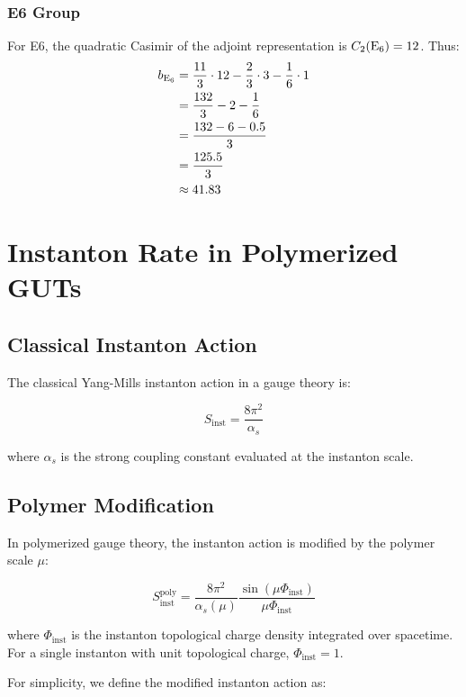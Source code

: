 \documentclass[11pt]{article}
\begin{document}
\subsubsection{E6 Group}
For E6, the quadratic Casimir of the adjoint representation is $C_2(\mathrm{E}_{6}) = 12$. Thus:
\begin{align}
b_{\mathrm{E}_{6}} &= \frac{11}{3} \cdot 12 - \frac{2}{3} \cdot 3 - \frac{1}{6} \cdot 1\\
&= \frac{132}{3} - 2 - \frac{1}{6}\\
&= \frac{132 - 6 - 0.5}{3}\\
&= \frac{125.5}{3}\\
&\approx 41.83
\end{align}

\section{Instanton Rate in Polymerized GUTs}

\subsection{Classical Instanton Action}

The classical Yang-Mills instanton action in a gauge theory is:

\begin{equation}
S_{\mathrm{inst}} = \frac{8\pi^2}{\alpha_s}
\end{equation}

where $\alpha_s$ is the strong coupling constant evaluated at the instanton scale.

\subsection{Polymer Modification}

In polymerized gauge theory, the instanton action is modified by the polymer scale $\mu$:

\begin{equation}
S_{\mathrm{inst}}^{\mathrm{poly}} = \frac{8\pi^2}{\alpha_s(\mu)}\frac{\sin(\mu\Phi_{\mathrm{inst}})}{\mu\Phi_{\mathrm{inst}}}
\end{equation}

where $\Phi_{\mathrm{inst}}$ is the instanton topological charge density integrated over spacetime. For a single instanton with unit topological charge, $\Phi_{\mathrm{inst}} = 1$.

For simplicity, we define the modified instanton action as:
\end{document}

